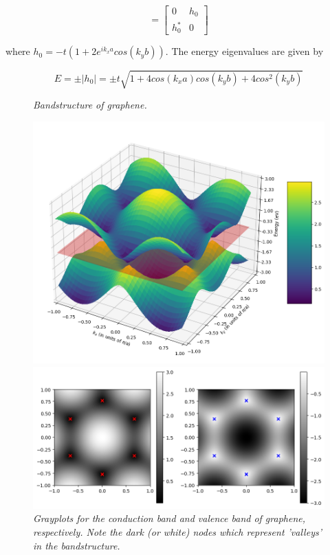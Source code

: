 \documentclass{resonance}
\begin{document}
\begin{equation}
[h(\vec{k})] =
    \begin{bmatrix}
        0 & h_{0} \\
        h_{0}^{*} & 0 
    \end{bmatrix}
\end{equation}

where $h_{0} = -t(1+2e^{ik_{x}a}cos(k_{y}b))$. The energy eigenvalues are given by 

\begin{equation}
    E = \pm |h_{0}| = \pm t\sqrt{1 + 4cos(k_{x}a)cos(k_{y}b) + 4cos^{2}(k_{y}b)}
\end{equation}

\begin{figure}[!htbp]
\caption{\textit{Bandstructure of graphene.}}\label{graphene_bands}
\vspace{2pt}
\centering
\includegraphics[scale=0.45]{graphene_bands.png}
\vspace{6pt}
\caption{\textit{Grayplots for the conduction band and valence band of graphene, respectively. Note the dark (or white) nodes which represent 'valleys' in the bandstructure.}}\label{graphene_grayplot}
\vspace{2pt}
\includegraphics[scale=0.5]{graphene_grayplot.png}
\end{figure}
\end{document}
